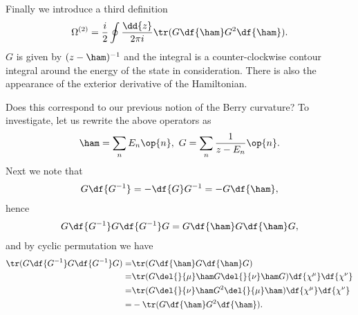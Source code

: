 Finally we introduce a third definition
\begin{align*}
	\Omega^{(2)} = \frac{i}{2}\oint\frac{\dd{z}}{2\pi i}\tr(G\df{\ham}G^{2}\df{\ham}).
\end{align*}
$G$ is given by $(z - \ham)^{-1}$ and the integral is a counter-clockwise contour integral around the energy of the state in consideration. There is also the appearance of the exterior derivative of the Hamiltonian.

Does this correspond to our previous notion of the Berry curvature? To investigate, let us rewrite the above operators as
\begin{align*}
	\ham = \sum\limits_{n}E_{n}\op{n},\ G = \sum\limits_{n}\frac{1}{z - E_{n}}\op{n}.
\end{align*}
Next we note that
\begin{align*}
	G\df{G^{-1}} = -\df{G}G^{-1} = -G\df{\ham},
\end{align*}
hence
\begin{align*}
	G\df{G^{-1}}G\df{G^{-1}}G = G\df{\ham}G\df{\ham}G,
\end{align*}
and by cyclic permutation we have
\begin{align*}
	\tr(G\df{G^{-1}}G\df{G^{-1}}G) =& \tr(G\df{\ham}G\df{\ham}G) \\
	=& \tr(G\del{}{\mu}\ham G\del{}{\nu}\ham G)\df{\chi^{\mu}}\df{\chi^{\nu}} \\
	=& \tr(G\del{}{\nu}\ham G^{2}\del{}{\mu}\ham)\df{\chi^{\mu}}\df{\chi^{\nu}} \\
	=& -\tr(G\df{\ham}G^{2}\df{\ham}).
\end{align*}

